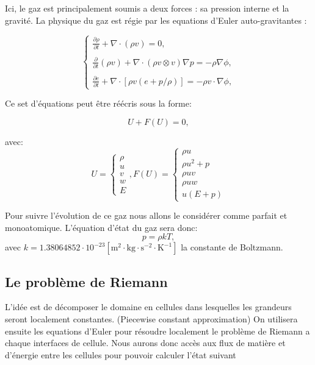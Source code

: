 Ici, le gaz est principalement soumis a deux forces : sa pression interne et la gravité.
La physique du gaz est régie par les equations d'Euler auto-gravitantes :

\begin{equation}
\begin{cases}

{ \frac{ \partial \rho }{ \partial t } + \nabla \cdot (\rho v) = 0}, \\
\\
{ \frac{ \partial }{ \partial t } (\rho v) + \nabla \cdot (\rho v \otimes v ) \nabla p = -\rho\nabla \phi }, \\
\\
{ \frac{ \partial e }{ \partial t } + \nabla \cdot [ \rho v (e+p/\rho) ] = -\rho v \cdot \nabla \phi },

\end{cases}
\end{equation}
\label{eq:hydro}

Ce set d'équations peut être réécris sous la forme:

\begin{equation}
U+F(U) = 0,
\end{equation}

avec:
\begin{equation}
U=
\begin{cases}
{ \rho}\\
{ u}\\
{ v}\\
{ w}\\
{ E}
\end{cases}
,
F(U)=
\begin{cases}
{ \rho u}\\
{ \rho u^2+p}\\
{ \rho uv}\\
{ \rho uw}\\
{ u(E+p)}
\end{cases}
\end{equation}

Pour suivre l'évolution de ce gaz nous allons le considérer comme parfait et monoatomique.
L’équation d'état du gaz sera donc:
\begin{equation}
p=\rho k T, 
\end{equation}
avec $k=1.38064852 \cdot 10^{-23} \left[ \mathrm{m^2 \cdot kg \cdot s^{-2} \cdot K^{-1}} \right] $ la constante de Boltzmann.


\subsection{Le problème de Riemann}
L'idée est de décomposer le domaine en cellules dans lesquelles les grandeurs seront localement constantes. (Piecewise constant approximation)
On utilisera ensuite les equations d'Euler pour résoudre localement le problème de Riemann a chaque interfaces de cellule.
Nous aurons donc accès aux flux de matière et d'énergie entre les cellules pour pouvoir calculer l'état suivant  

